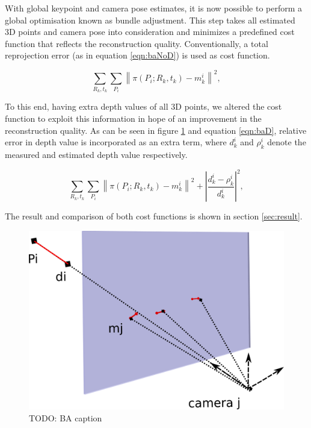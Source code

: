 \documentclass[10pt,twocolumn,letterpaper]{article}
\newcommand{\norm}[1]{\left\lVert #1 \right\rVert}
\begin{document}
With global keypoint and camera pose estimates, it is now possible to perform a
global optimisation known as bundle adjustment. This step takes all estimated 3D
points and camera pose into consideration and minimizes a predefined cost
function that reflects the reconstruction quality.
Conventionally, a total reprojection error (as in equation \ref{eqn:baNoD})
is used as cost function.

\begin{equation}\label{eqn:baNoD}
\sum_{R_k,t_k}\sum_{P_i}{\norm{\pi\left(P_i;R_k,t_k\right)-m^i_{k}}}^2,
\end{equation}

To this end, having extra depth values of all 3D points, we altered the cost
function to exploit this information in hope of an improvement in the
reconstruction quality. As can be seen in figure \ref{fig:baCost} and equation
\ref{eqn:baD}, relative error in depth value is incorporated as an extra term,
where $d^i_k$ and $\rho^i_k$ denote the measured and estimated depth value
respectively.

\begin{equation}\label{eqn:baD}
\sum_{R_k,t_k}\sum_{P_i}{\norm{\pi\left(P_i;R_k,t_k\right)-m^i_{k}}^2+\left\lvert\dfrac{d^i_k-\rho^i_k}{d^i_k}\right\rvert ^2},
\end{equation}

The result and comparison of both cost functions is shown in section \ref{sec:result}.

\begin{figure}[t]
\begin{center}
   \includegraphics[width=0.9\linewidth]{figures/ba.pdf}
\end{center}
\caption{TODO: BA caption}
\label{fig:baCost}
\end{figure}
\end{document}
